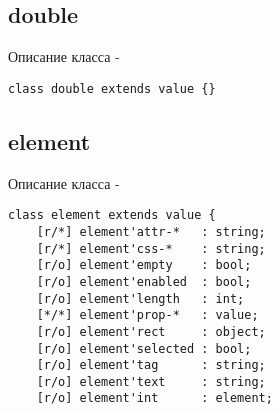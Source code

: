 \subsection{{\color{lightblue} double}}

\noindent Описание класса \double -
\begin{verbatim}
class double extends value {}
\end{verbatim}

\subsection{{\color{lightblue} element}}

\noindent Описание класса \element -
\begin{verbatim}
class element extends value {
    [r/*] element'attr-*   : string;
    [r/*] element'css-*    : string;
    [r/o] element'empty    : bool;
    [r/o] element'enabled  : bool;
    [r/o] element'length   : int;
    [*/*] element'prop-*   : value;
    [r/o] element'rect     : object;
    [r/o] element'selected : bool;
    [r/o] element'tag      : string;
    [r/o] element'text     : string;
    [r/o] element'int      : element;


\end{verbatim}
